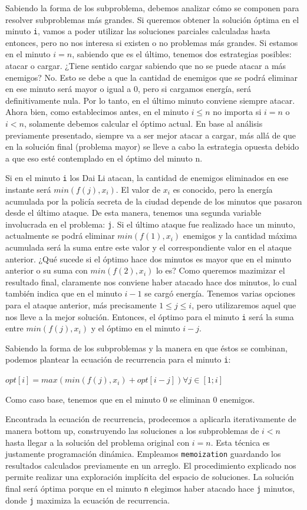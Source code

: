 \documentclass{article}
\begin{document}
Sabiendo la forma de los subproblema, debemos analizar cómo se componen para resolver subproblemas más grandes. Si queremos obtener la solución óptima en el minuto \texttt{i}, vamos a poder utilizar las soluciones parciales calculadas hasta entonces, pero no nos interesa si existen o no problemas más grandes. Si estamos en el minuto $i = n$, sabiendo que es el último, tenemos dos estrategias posibles: atacar o cargar. ¿Tiene sentido cargar sabiendo que no se puede atacar a más enemigos? No. Esto se debe a que la cantidad de enemigos que se podrá eliminar en ese minuto será  mayor o igual a 0, pero si cargamos energía, será definitivamente nula. Por lo tanto, en el último minuto conviene siempre atacar. Ahora bien, como establecimos antes, en el minuto $i \leq n$ no importa si $i = n$ o $i < n$, solamente debemos calcular el óptimo actual. En base al análisis previamente presentado, siempre va a ser mejor atacar a cargar, más allá de que en la solución final (problema mayor) se lleve a cabo la estrategia opuesta debido a que eso esté contemplado en el óptimo del minuto n. 

Si en el minuto \texttt{i} los Dai Li atacan, la cantidad de enemigos eliminados en ese instante será $min(f(j), x_i)$. El valor de $x_i$ es conocido, pero la energía acumulada por la policía secreta de la ciudad depende de los minutos que pasaron desde el último ataque. De esta manera, tenemos una segunda variable involucrada en el problema: \texttt{j}. Si el último ataque fue realizado hace un minuto, actualmente se podrá eliminar $min(f(1), x_i)$ enemigos y la cantidad máxima acumulada será la suma entre este valor y el correspondiente valor en el ataque anterior. ¿Qué sucede si el óptimo hace dos minutos es mayor que en el minuto anterior o su suma con $min(f(2), x_i)$ lo es? Como queremos mazimizar el resultado final, claramente nos conviene haber atacado hace dos minutos, lo cual también indica que en el minuto $i - 1$ se cargó energía. Tenemos varias opciones para el ataque anterior, más precisamente $1 \leq j \leq i$, pero utilizaremos aquel que nos lleve a la mejor solución. Entonces, el óptimo para el minuto \texttt{i} será la suma entre $min(f(j), x_i)$ y el óptimo en el minuto $i - j$.

Sabiendo la forma de los subproblemas y la manera en que éstos se combinan, podemos plantear la ecuación de recurrencia para el minuto \texttt{i}:

$
opt[i] = max(min(f(j), x_i) + opt[i - j]) \forall j \in [1; i]
$

Como caso base, tenemos que en el minuto 0 se eliminan 0 enemigos.

Encontrada la ecuación de recurrencia, prodecemos a aplicarla iterativamente de manera bottom up, construyendo las soluciones a los subproblemas de $i < n$ hasta llegar a la solución del problema original con $i = n$. Esta técnica es justamente programación dinámica. Empleamos \texttt{memoization} guardando los resultados calculados previamente en un arreglo. El procedimiento explicado nos permite realizar una exploración implícita del espacio de soluciones. La solución final será óptima porque en el minuto \texttt{n} elegimos haber atacado hace \texttt{j} minutos, donde \texttt{j} maximiza la ecuación de recurrencia.
\end{document}
